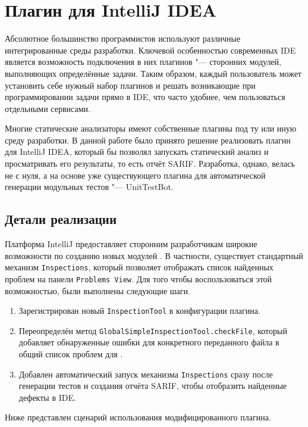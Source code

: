 \section{Плагин для IntelliJ IDEA}

Абсолютное большинство программистов используют различные интегрированные среды разработки. Ключевой особенностью современных IDE является возможность подключения в них плагинов "--- сторонних модулей, выполняющих определённые задачи. Таким образом, каждый пользователь может установить себе нужный набор плагинов и решать возникающие при программировании задачи прямо в IDE, что часто удобнее, чем пользоваться отдельными сервисами.

Многие статические анализаторы имеют собственные плагины под ту или иную среду разработки. В данной работе было принято решение реализовать плагин для IntelliJ IDEA, который бы позволял запускать статический анализ и просматривать его результаты, то есть отчёт SARIF. Разработка, однако, велась не с нуля, а на основе уже существующего плагина для автоматической генерации модульных тестов "--- UnitTestBot.

\subsection{Детали реализации}

Платформа IntelliJ предоставляет сторонним разработчикам широкие возможности по созданию новых модулей \cite{idea-plugins}. В частности, существует стандартный механизм \verb|Inspections|, который позволяет отображать список найденных проблем на панели \verb|Problems View|. Для того чтобы воспользоваться этой возможностью, были выполнены следующие шаги.

\begin{enumerate}
    \item Зарегистрирован новый \verb|InspectionTool| в конфигурации плагина.
    \item Переопределён метод \verb|GlobalSimpleInspectionTool.checkFile|, который добавляет обнаруженные ошибки для конкретного переданного файла  в общий список проблем для .
    \item Добавлен автоматический запуск механизма \verb|Inspections| сразу после генерации тестов и создания отчёта SARIF, чтобы отобразить найденные дефекты в IDE.
\end{enumerate}

Ниже представлен сценарий использования модифицированного плагина.

